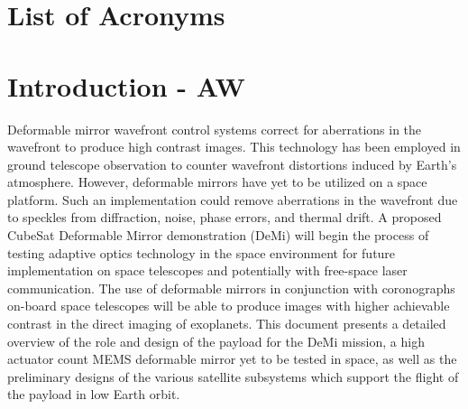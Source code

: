 \documentclass[12pt]{article}
\begin{document}
\newpage
\tableofcontents
\listoffigures
\listoftables


\section*{List of Acronyms}
\begin{acronym}


\end{acronym}
\newpage

\section{Introduction - AW}

Deformable mirror wavefront control systems correct for aberrations in the wavefront to produce high contrast images.  This technology has been employed in ground telescope observation to counter wavefront distortions induced by Earth's atmosphere.  However, deformable mirrors have yet to be utilized on a space platform.  Such an implementation could remove aberrations in the wavefront due to speckles from diffraction, noise, phase errors, and thermal drift.  A proposed CubeSat Deformable Mirror demonstration (DeMi) will begin the process of testing adaptive optics technology in the space environment for future implementation on space telescopes and potentially with free-space laser communication.  The use of deformable mirrors in conjunction with coronographs on-board space telescopes will be able to produce images with higher achievable contrast in the direct imaging of exoplanets.  This document presents a detailed overview of the role and design of the payload for the DeMi mission, a high actuator count MEMS deformable mirror yet to be tested in space, as well as the preliminary designs of the various satellite subsystems which support the flight of the payload in low Earth orbit.  
\end{document}
